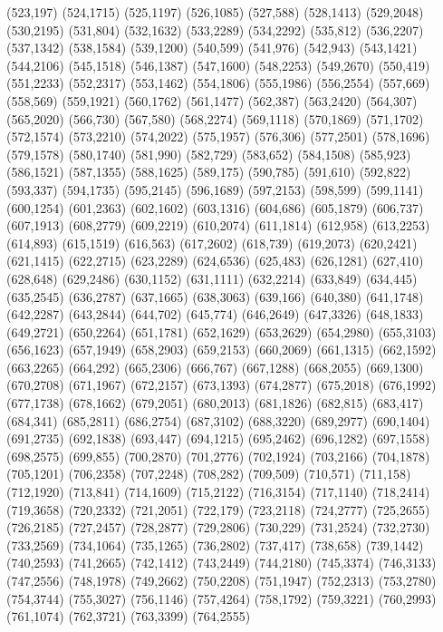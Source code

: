 (523,197)
(524,1715)
(525,1197)
(526,1085)
(527,588)
(528,1413)
(529,2048)
(530,2195)
(531,804)
(532,1632)
(533,2289)
(534,2292)
(535,812)
(536,2207)
(537,1342)
(538,1584)
(539,1200)
(540,599)
(541,976)
(542,943)
(543,1421)
(544,2106)
(545,1518)
(546,1387)
(547,1600)
(548,2253)
(549,2670)
(550,419)
(551,2233)
(552,2317)
(553,1462)
(554,1806)
(555,1986)
(556,2554)
(557,669)
(558,569)
(559,1921)
(560,1762)
(561,1477)
(562,387)
(563,2420)
(564,307)
(565,2020)
(566,730)
(567,580)
(568,2274)
(569,1118)
(570,1869)
(571,1702)
(572,1574)
(573,2210)
(574,2022)
(575,1957)
(576,306)
(577,2501)
(578,1696)
(579,1578)
(580,1740)
(581,990)
(582,729)
(583,652)
(584,1508)
(585,923)
(586,1521)
(587,1355)
(588,1625)
(589,175)
(590,785)
(591,610)
(592,822)
(593,337)
(594,1735)
(595,2145)
(596,1689)
(597,2153)
(598,599)
(599,1141)
(600,1254)
(601,2363)
(602,1602)
(603,1316)
(604,686)
(605,1879)
(606,737)
(607,1913)
(608,2779)
(609,2219)
(610,2074)
(611,1814)
(612,958)
(613,2253)
(614,893)
(615,1519)
(616,563)
(617,2602)
(618,739)
(619,2073)
(620,2421)
(621,1415)
(622,2715)
(623,2289)
(624,6536)
(625,483)
(626,1281)
(627,410)
(628,648)
(629,2486)
(630,1152)
(631,1111)
(632,2214)
(633,849)
(634,445)
(635,2545)
(636,2787)
(637,1665)
(638,3063)
(639,166)
(640,380)
(641,1748)
(642,2287)
(643,2844)
(644,702)
(645,774)
(646,2649)
(647,3326)
(648,1833)
(649,2721)
(650,2264)
(651,1781)
(652,1629)
(653,2629)
(654,2980)
(655,3103)
(656,1623)
(657,1949)
(658,2903)
(659,2153)
(660,2069)
(661,1315)
(662,1592)
(663,2265)
(664,292)
(665,2306)
(666,767)
(667,1288)
(668,2055)
(669,1300)
(670,2708)
(671,1967)
(672,2157)
(673,1393)
(674,2877)
(675,2018)
(676,1992)
(677,1738)
(678,1662)
(679,2051)
(680,2013)
(681,1826)
(682,815)
(683,417)
(684,341)
(685,2811)
(686,2754)
(687,3102)
(688,3220)
(689,2977)
(690,1404)
(691,2735)
(692,1838)
(693,447)
(694,1215)
(695,2462)
(696,1282)
(697,1558)
(698,2575)
(699,855)
(700,2870)
(701,2776)
(702,1924)
(703,2166)
(704,1878)
(705,1201)
(706,2358)
(707,2248)
(708,282)
(709,509)
(710,571)
(711,158)
(712,1920)
(713,841)
(714,1609)
(715,2122)
(716,3154)
(717,1140)
(718,2414)
(719,3658)
(720,2332)
(721,2051)
(722,179)
(723,2118)
(724,2777)
(725,2655)
(726,2185)
(727,2457)
(728,2877)
(729,2806)
(730,229)
(731,2524)
(732,2730)
(733,2569)
(734,1064)
(735,1265)
(736,2802)
(737,417)
(738,658)
(739,1442)
(740,2593)
(741,2665)
(742,1412)
(743,2449)
(744,2180)
(745,3374)
(746,3133)
(747,2556)
(748,1978)
(749,2662)
(750,2208)
(751,1947)
(752,2313)
(753,2780)
(754,3744)
(755,3027)
(756,1146)
(757,4264)
(758,1792)
(759,3221)
(760,2993)
(761,1074)
(762,3721)
(763,3399)
(764,2555)
